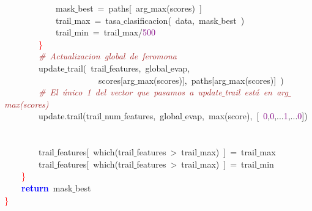 \mbox{}\ \ \ \ \ \ \ \ \ \ \ \ mask$\_$best\ \textcolor{BrickRed}{=}\ paths\textcolor{BrickRed}{[}\ arg$\_$max\textcolor{BrickRed}{(}scores\textcolor{BrickRed}{)}\ \textcolor{BrickRed}{]} \\
\mbox{}\ \ \ \ \ \ \ \ \ \ \ \ trail$\_$max\ \textcolor{BrickRed}{=}\ tasa$\_$clasificacion\textcolor{BrickRed}{(}\ data\textcolor{BrickRed}{,}\ mask$\_$best\ \textcolor{BrickRed}{)} \\
\mbox{}\ \ \ \ \ \ \ \ \ \ \ \ trail$\_$min\ \textcolor{BrickRed}{=}\ trail$\_$max\textcolor{BrickRed}{/}\textcolor{Purple}{500} \\
\mbox{}\ \ \ \ \ \ \ \ \textcolor{Red}{\}} \\
\mbox{}\ \ \ \ \ \ \ \ \textit{\textcolor{Brown}{\#\ Actualizacion\ global\ de\ feromona}} \\
\mbox{}\ \ \ \ \ \ \ \ update$\_$trail\textcolor{BrickRed}{(}\ trail$\_$features\textcolor{BrickRed}{,}\ global$\_$evap\textcolor{BrickRed}{,} \\
\mbox{}\ \ \ \ \ \ \ \ \ \ \ \ \ \ \ \ \ \ \ \ \ \ scores\textcolor{BrickRed}{[}arg$\_$max\textcolor{BrickRed}{(}scores\textcolor{BrickRed}{)],}\ paths\textcolor{BrickRed}{[}arg$\_$max\textcolor{BrickRed}{(}scores\textcolor{BrickRed}{)]}\ \textcolor{BrickRed}{)} \\
\mbox{}\ \ \ \ \ \ \ \ \textit{\textcolor{Brown}{\#\ El\ único\ 1\ del\ vector\ que\ pasamos\ a\ update$\_$trail\ está\ en\ arg$\_$max(scores)}} \\
\mbox{}\ \ \ \ \ \ \ \ update\textcolor{BrickRed}{.}trail\textcolor{BrickRed}{(}trail$\_$num$\_$features\textcolor{BrickRed}{,}\ global$\_$evap\textcolor{BrickRed}{,}\ max\textcolor{BrickRed}{(}score\textcolor{BrickRed}{),}\ \textcolor{BrickRed}{[}\ \textcolor{Purple}{0}\textcolor{BrickRed}{,}\textcolor{Purple}{0}\textcolor{BrickRed}{,...}\textcolor{Purple}{1}\textcolor{BrickRed}{,...}\textcolor{Purple}{0}\textcolor{BrickRed}{])} \\
\mbox{} \\
\mbox{} \\
\mbox{}\ \ \ \ \ \ \ \ trail$\_$features\textcolor{BrickRed}{[}\ which\textcolor{BrickRed}{(}trail$\_$features\ \textcolor{BrickRed}{\textgreater{}}\ trail$\_$max\textcolor{BrickRed}{)}\ \textcolor{BrickRed}{]}\ \textcolor{BrickRed}{=}\ trail$\_$max \\
\mbox{}\ \ \ \ \ \ \ \ trail$\_$features\textcolor{BrickRed}{[}\ which\textcolor{BrickRed}{(}trail$\_$features\ \textcolor{BrickRed}{\textgreater{}}\ trail$\_$max\textcolor{BrickRed}{)}\ \textcolor{BrickRed}{]}\ \textcolor{BrickRed}{=}\ trail$\_$min \\
\mbox{}\ \ \ \ \textcolor{Red}{\}} \\
\mbox{}\ \ \ \ \textbf{\textcolor{Blue}{return}}\ mask$\_$best \\
\mbox{}\textcolor{Red}{\}} \\
\mbox{}
